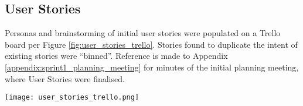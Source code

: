 \subsection{User Stories}

Personas and brainstorming of initial user stories were populated on a Trello board per Figure \ref{fig:user_stories_trello}.
Stories found to duplicate the intent of existing stories were ``binned''. 
Reference is made to Appendix \ref{appendix:sprint1_planning_meeting} for minutes of the initial planning meeting, where User Stories were finalised.

\begin{center}
	\texttt{[image: user\_stories\_trello.png]}
	\label{fig:user_stories_trello}
\end{center}

